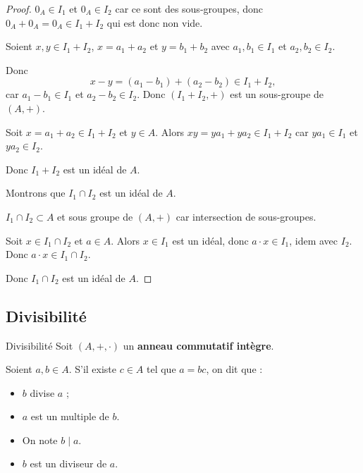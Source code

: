 \begin{proof}
    $0_A \in I_1$ et $0_A \in I_2$ car ce sont des sous-groupes, donc $0_A  + 0_A = 0_A \in I_1 + I_2$
    qui est donc non vide.

    Soient $x, y \in I_1 + I_2$, $x = a_1 + a_2$ et $y = b_1 + b_2$ avec $a_1, b_1 \in I_1$ et $a_2, b_2 \in I_2$.

    Donc \[
        x - y = (a_1 - b_1) + (a_2 - b_2) \in I_1 + I_2,
    \]
    car $a_1 - b_1 \in I_1$ et $a_2 - b_2 \in I_2$.
    Donc $(I_1 + I_2, +)$ est un sous-groupe de $(A, +)$.

    Soit $x = a_1 + a_2 \in I_1 + I_2$ et $y \in A$. Alors 
    $xy = y a_1 + y a_2 \in I_1 + I_2$ car $y a_1 \in I_1$ et $y a_2 \in I_2$.

    Donc $I_1 + I_2$ est un idéal de $A$.

    \svspace Montrons que $I_1 \cap I_2$ est un idéal de $A$.

    $I_1 \cap I_2 \subset A$ et sous groupe de $(A, +)$ car intersection de sous-groupes.

    Soit $x \in I_1 \cap I_2$ et $a \in A$. Alors $x \in I_1$ est un idéal, donc $a \cdot x \in I_1$, 
    idem avec $I_2$. Donc $a \cdot x \in I_1 \cap I_2$.

    Donc $I_1 \cap I_2$ est un idéal de $A$.
\end{proof}

\subsection{Divisibilité}


\lvspace \avspace \begin{definition}{Divisibilité}{}
    Soit $(A, +, \cdot)$ un \textbf{anneau commutatif intègre}. 

    Soient $a, b \in A$. S'il existe $c \in A$ tel que $a = bc$, on dit que : 
    \begin{itemize}
        \item $b$ divise $a$ ;
        \item $a$ est un multiple de $b$.
        \item On note $b \mid a$.
        \item $b$ est un diviseur de $a$.
    \end{itemize}
\end{definition}

